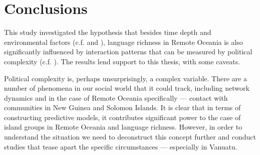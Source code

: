 \documentclass[12pt,letterpaper]{article}
\begin{document}
 

\FloatBarrier
\section{Conclusions}
This study investigated the hypothesis that besides time depth and environmental factors (c.f. \citet{curriemace2009, gavin2012island, hua2019ecological} and \citet{Pacheco_Coelho_2019}), language richness in Remote Oceania is also significantly influenced by interaction patterns that can be measured by political complexity (c.f. \citet{pawley81, pawley2007}). The results lend support to this thesis, with some caveats. 

Political complexity is, perhaps unsurprisingly, a complex variable. There are a number of phenomena in our social world that it could track, including network dynamics and in the case of Remote Oceania specifically --- contact with communities in New Guinea and Solomon Islands. It is clear that in terms of constructing predictive models, it contributes significant power to the case of island groups in Remote Oceania and language richness. However, in order to understand the situation we need to deconstruct this concept further and conduct studies that tease apart the specific circumstances --- especially in Vanuatu. 
\end{document}
